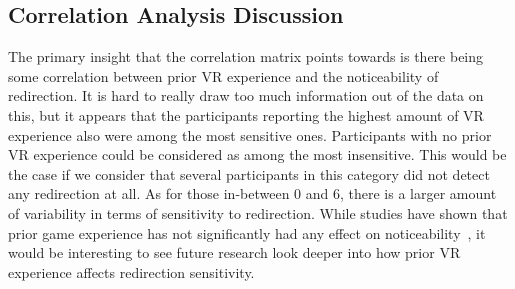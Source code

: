 \subsection{Correlation Analysis Discussion}
The primary insight that the correlation matrix points towards is there being some correlation between prior VR experience and the noticeability of redirection. It is hard to really draw too much information out of the data on this, but it appears that the participants reporting the highest amount of VR experience also were among the most sensitive ones. Participants with no prior VR experience could be considered as among the most insensitive. This would be the case if we consider that several participants in this category did not detect any redirection at all. As for those in-between 0 and 6, there is a larger amount of variability in terms of sensitivity to redirection. While studies have shown that prior game experience has not significantly had any effect on noticeability~\cite{nguyen2018individual}, it would be interesting to see future research look deeper into how prior VR experience affects redirection sensitivity.
